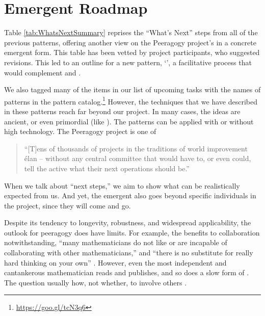 \section{Emergent Roadmap} \label{sec:Distributed_Roadmap}

Table \ref{tab:WhatsNextSummary} reprises the ``What's Next'' steps
from all of the previous patterns, offering another view on the
Peeragogy project's  in a concrete emergent form.
%
This table has been vetted by project participants, who suggested
revisions.  This led to an outline for a new pattern,
`', a facilitative process that would
complement  and .

We also tagged many of the items in our list of upcoming tasks with the names of
patterns in the pattern catalog.\footnote{\url{https://goo.gl/tcN3q6}}
However, the techniques that we have described in these patterns reach
far beyond our project.  In many cases, the ideas are ancient, or even
primordial (like ).  The patterns can be
applied with or without high technology.  The Peeragogy project is one
of
\begin{quote}
 ``[T]ens of thousands of projects in the traditions of world
improvement \'elan -- without any central committee that would have
to, or even could, tell the active what their next operations should
be.'' \cite[p. 402]{sloterdijk2013change}
\end{quote}
When we talk about ``next steps,'' we aim to show what can be
realistically expected from us.
And yet, the emergent  also goes beyond specific
individuals in the project, since they will come and go.

Despite its tendency to longevity, robustness, and
widespread applicability, the outlook for peeragogy does have limits. For example,
the benefits to collaboration
notwithstanding, ``many mathematicians do not like or are incapable of
collaborating with other mathematicians,'' and 
``there is no substitute for really hard
thinking on your own'' \cite{atiyah1974research}.
However, even the most independent and cantankerous
mathematician reads and publishes, and so does a slow form of
.  The question usually how, not whether, to involve others \cite{coase1937nature,coases-penguin}.

